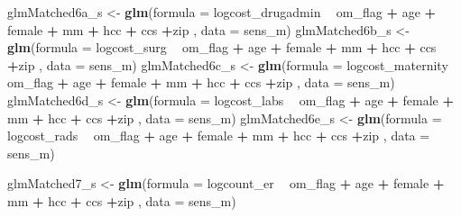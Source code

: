 \documentclass[]{article}
\newenvironment{Shaded}{\begin{snugshade}}{\end{snugshade}}
\newcommand{\KeywordTok}[1]{\textcolor[rgb]{0.13,0.29,0.53}{\textbf{#1}}}
\newcommand{\DataTypeTok}[1]{\textcolor[rgb]{0.13,0.29,0.53}{#1}}
\newcommand{\StringTok}[1]{\textcolor[rgb]{0.31,0.60,0.02}{#1}}
\newcommand{\OperatorTok}[1]{\textcolor[rgb]{0.81,0.36,0.00}{\textbf{#1}}}
\newcommand{\NormalTok}[1]{#1}
\begin{document}
\begin{Shaded}
\begin{Highlighting}[]
\NormalTok{glmMatched6a_s <-}\StringTok{ }\KeywordTok{glm}\NormalTok{(}\DataTypeTok{formula =}\NormalTok{ logcost_drugadmin }\OperatorTok{~}\StringTok{ }\NormalTok{om_flag }\OperatorTok{+}\StringTok{ }\NormalTok{age }\OperatorTok{+}\StringTok{ }\NormalTok{female }\OperatorTok{+}\StringTok{ }\NormalTok{mm }\OperatorTok{+}\StringTok{ }\NormalTok{hcc }\OperatorTok{+}\StringTok{ }\NormalTok{ccs }\OperatorTok{+}\NormalTok{zip ,}
                    \DataTypeTok{data    =}\NormalTok{ sens_m)}
\NormalTok{glmMatched6b_s <-}\StringTok{ }\KeywordTok{glm}\NormalTok{(}\DataTypeTok{formula =}\NormalTok{ logcost_surg }\OperatorTok{~}\StringTok{ }\NormalTok{om_flag }\OperatorTok{+}\StringTok{ }\NormalTok{age }\OperatorTok{+}\StringTok{ }\NormalTok{female }\OperatorTok{+}\StringTok{ }\NormalTok{mm }\OperatorTok{+}\StringTok{ }\NormalTok{hcc }\OperatorTok{+}\StringTok{ }\NormalTok{ccs }\OperatorTok{+}\NormalTok{zip ,}
                    \DataTypeTok{data    =}\NormalTok{ sens_m)}
\NormalTok{glmMatched6c_s <-}\StringTok{ }\KeywordTok{glm}\NormalTok{(}\DataTypeTok{formula =}\NormalTok{ logcost_maternity }\OperatorTok{~}\StringTok{ }\NormalTok{om_flag }\OperatorTok{+}\StringTok{ }\NormalTok{age }\OperatorTok{+}\StringTok{ }\NormalTok{female }\OperatorTok{+}\StringTok{ }\NormalTok{mm }\OperatorTok{+}\StringTok{ }\NormalTok{hcc }\OperatorTok{+}\StringTok{ }\NormalTok{ccs }\OperatorTok{+}\NormalTok{zip ,}
                    \DataTypeTok{data    =}\NormalTok{ sens_m)}
\NormalTok{glmMatched6d_s <-}\StringTok{ }\KeywordTok{glm}\NormalTok{(}\DataTypeTok{formula =}\NormalTok{ logcost_labs }\OperatorTok{~}\StringTok{ }\NormalTok{om_flag }\OperatorTok{+}\StringTok{ }\NormalTok{age }\OperatorTok{+}\StringTok{ }\NormalTok{female }\OperatorTok{+}\StringTok{ }\NormalTok{mm }\OperatorTok{+}\StringTok{ }\NormalTok{hcc }\OperatorTok{+}\StringTok{ }\NormalTok{ccs }\OperatorTok{+}\NormalTok{zip ,}
                    \DataTypeTok{data    =}\NormalTok{ sens_m)}
\NormalTok{glmMatched6e_s <-}\StringTok{ }\KeywordTok{glm}\NormalTok{(}\DataTypeTok{formula =}\NormalTok{ logcost_rads }\OperatorTok{~}\StringTok{ }\NormalTok{om_flag }\OperatorTok{+}\StringTok{ }\NormalTok{age }\OperatorTok{+}\StringTok{ }\NormalTok{female }\OperatorTok{+}\StringTok{ }\NormalTok{mm }\OperatorTok{+}\StringTok{ }\NormalTok{hcc }\OperatorTok{+}\StringTok{ }\NormalTok{ccs }\OperatorTok{+}\NormalTok{zip ,}
                    \DataTypeTok{data    =}\NormalTok{ sens_m)}


\NormalTok{glmMatched7_s <-}\StringTok{ }\KeywordTok{glm}\NormalTok{(}\DataTypeTok{formula =}\NormalTok{ logcount_er }\OperatorTok{~}\StringTok{ }\NormalTok{om_flag }\OperatorTok{+}\StringTok{ }\NormalTok{age }\OperatorTok{+}\StringTok{ }\NormalTok{female }\OperatorTok{+}\StringTok{ }\NormalTok{mm }\OperatorTok{+}\StringTok{ }\NormalTok{hcc }\OperatorTok{+}\StringTok{ }\NormalTok{ccs }\OperatorTok{+}\NormalTok{zip ,}
                   \DataTypeTok{data    =}\NormalTok{ sens_m)}



\end{Highlighting}
\end{Shaded}
\end{document}
